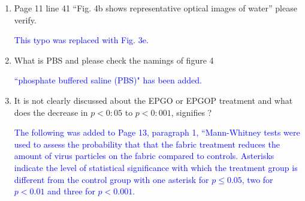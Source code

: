 \documentclass[12pt]{letter}
\newcommand{\blue}[1]{\textcolor{blue}{#1}} %
\begin{document}
\begin{enumerate}
\item  Page 11 line 41 “Fig. 4b shows representative optical images of water” please verify.

\blue{This typo was replaced with Fig. 3e. }

\item   What is PBS and please check the namings of figure 4

\blue{``phosphate buffered saline (PBS)" has been added. }

\item   It is not clearly discussed about the EPGO or EPGOP treatment and what does the decrease in $p <0:05$ to $p <0:001$, signifies ?

\blue{The following was added to Page 13, paragraph 1,
``Mann-Whitney tests were used to assess the probability that that the fabric treatment reduces the amount of virus particles on the fabric compared to controls. 
Asterisks indicate the 
level of statistical significance with 
which the treatment
group is 
different 
from the control group %
with one asterisk for $p \leq 0.05$, two for $p < 0.01$ and three for $p < 0.001$.} %



\end{enumerate}
\end{document}
